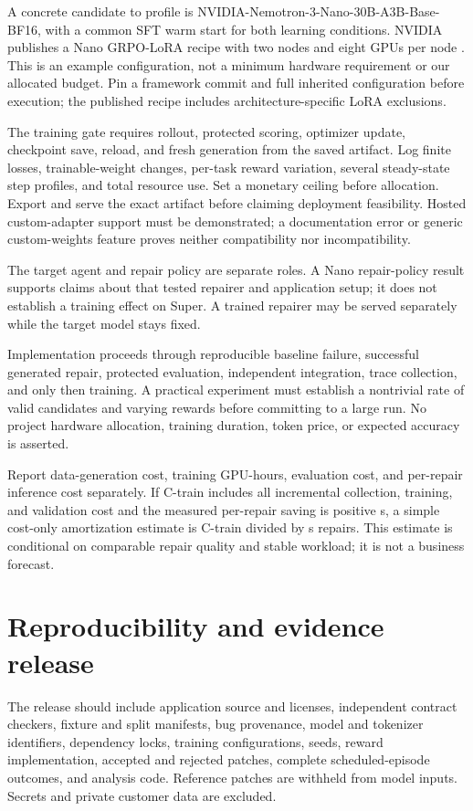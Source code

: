 \documentclass[11pt,a4paper]{article}
\begin{document}
A concrete candidate to profile is NVIDIA-Nemotron-3-Nano-30B-A3B-Base-BF16, with a common SFT warm start for both learning conditions. NVIDIA publishes a Nano GRPO-LoRA recipe with two nodes and eight GPUs per node \cite{ref27}. This is an example configuration, not a minimum hardware requirement or our allocated budget. Pin a framework commit and full inherited configuration before execution; the published recipe includes architecture-specific LoRA exclusions.

The training gate requires rollout, protected scoring, optimizer update, checkpoint save, reload, and fresh generation from the saved artifact. Log finite losses, trainable-weight changes, per-task reward variation, several steady-state step profiles, and total resource use. Set a monetary ceiling before allocation. Export and serve the exact artifact before claiming deployment feasibility. Hosted custom-adapter support must be demonstrated; a documentation error or generic custom-weights feature proves neither compatibility nor incompatibility.

The target agent and repair policy are separate roles. A Nano repair-policy result supports claims about that tested repairer and application setup; it does not establish a training effect on Super. A trained repairer may be served separately while the target model stays fixed.

Implementation proceeds through reproducible baseline failure, successful generated repair, protected evaluation, independent integration, trace collection, and only then training. A practical experiment must establish a nontrivial rate of valid candidates and varying rewards before committing to a large run. No project hardware allocation, training duration, token price, or expected accuracy is asserted.

Report data-generation cost, training GPU-hours, evaluation cost, and per-repair inference cost separately. If C-train includes all incremental collection, training, and validation cost and the measured per-repair saving is positive s, a simple cost-only amortization estimate is C-train divided by s repairs. This estimate is conditional on comparable repair quality and stable workload; it is not a business forecast.

\section{Reproducibility and evidence release}
The release should include application source and licenses, independent contract checkers, fixture and split manifests, bug provenance, model and tokenizer identifiers, dependency locks, training configurations, seeds, reward implementation, accepted and rejected patches, complete scheduled-episode outcomes, and analysis code. Reference patches are withheld from model inputs. Secrets and private customer data are excluded.
\end{document}

